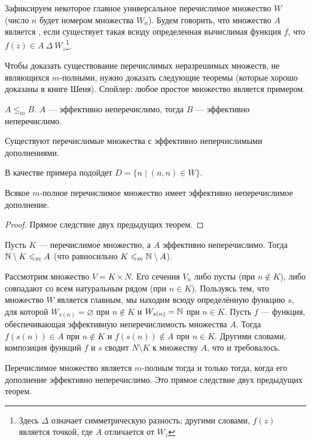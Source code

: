 \begin{defn}
    Зафиксируем некоторое главное универсальное перечислимое множество $ W$ (число $ n$ будет номером множества $W_n$).
	Будем говорить, что множество $ A$ является , если существует такая всюду определенная вычислимая функция $ f$, что $ f(z) \in A ~\Delta ~W_z$\footnote{Здесь $ \Delta$ означает симметрическую разность; другими словами, $ f(z)$ является точкой, где $ A$ отличается от $ W_z$}.
\end{defn}
Чтобы доказать существование перечислимых неразрешимых множеств, не являющихся $m$-полными, нужно доказать следующие теоремы (которые хорошо доказаны в книге Шеня). Спойлер: любое простое множество является примером.
\begin{thm}
    $A \le_m B$. $A$ --- эффективно неперечислимо, тогда $B$ --- эффективно неперечислимо.
\end{thm}
\begin{thm}
    Существуют перечислимые множества с эффективно неперчислимыми дополнениями.
\end{thm}
\begin{proof*}
    В качестве примера подойдет $D = \{n \mid (n, n) \in W\}$.
\end{proof*}
\begin{thm}
    Всякое $m$-полное перечислимое множество имеет эффективно неперечислимое дополнение.
\end{thm}
\begin{proof}
    Прямое следствие двух предыдущих теорем.
\end{proof}
\begin{thm}
    Пусть $K$ --- перечислимое множество, а $A$ эффективно неперечислимо. Тогда $\mathbb{N} \setminus K \leqslant_m A$ (что равносильно $K \leqslant_m \mathbb{N} \setminus A$).
\end{thm}
\begin{proof*}
     Рассмотрим множество $V = K \times N$. Его сечения $V_n$ либо
пусты (при $n \notin K$), либо совпадают со всем натуральным рядом
(при $n \in K$). Пользуясь тем, что множество $W$ является главным,
мы находим всюду определённую функцию $s$, для которой $W_{s(n)} 
= \varnothing$ при $n \notin K$ и $W_{s(n)} = \mathbb{N}$ при $n \in K$. Пусть $f$ — функция,
обеспечивающая эффективную неперечислимость множества $A$. Тогда $f(s(n)) \in A $ при $n \notin K$ и $f(s(n)) \notin A$ при $n \in K$. Другими
словами, композиция функций $f$ и $s$ сводит $N \setminus K$ к множеству $A$,
что и требовалось.
\end{proof*}
\begin{thm}
    Перечислимое множество является $m$-полным тогда
и только тогда, когда его дополнение эффективно неперечислимо. Это прямое следствие двух предыдущих теорем.
\end{thm}
